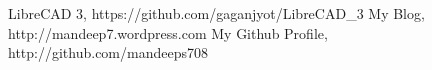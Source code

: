 \begin{thebibliography}{9}
\bibitem{} LibreCAD 3, https://github.com/gaganjyot/LibreCAD\_3
\bibitem{} My Blog, http://mandeep7.wordpress.com
\bibitem{} My Github Profile, http://github.com/mandeeps708
\end{thebibliography}
